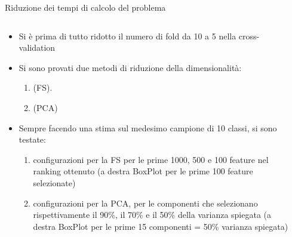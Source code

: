 \documentclass[9pt]{beamer}
\begin{document}
\begin{tframe}{Riduzione dei tempi di calcolo del problema}

\begin{columns}
    \begin{column}{.60\textwidth}
      \minipage[c][0.4\textheight][s]{\columnwidth}
		\begin{itemize}
				\item Si è prima di tutto ridotto il numero di fold da 10 a 5 nella cross-validation
			\onslide<2->
				\item Si sono provati due metodi di riduzione della dimensionalità:
				\begin{enumerate}
					\item {} (FS).
				\onslide<4->
					\item {} (PCA)
				\end{enumerate}
		\item Sempre facendo una stima sul medesimo campione di 10 classi, si sono testate:
		\begin{enumerate}
		\item configurazioni per la FS per le prime 1000, 500 e 100 feature nel ranking ottenuto (a destra BoxPlot per le prime 100 feature selezionate) 
		\onslide<6->
		\item configurazioni per la PCA, per le componenti che selezionano rispettivamente il 90\%, il 70\% e il 50\% della varianza spiegata (a destra BoxPlot per le prime 15 componenti = 50\% varianza spiegata)
		\end{enumerate}
		\end{itemize}	
	 \endminipage
	\end{column}
	
	\begin{column}{.40\textwidth}
      \end{column} 
\end{columns}
\end{tframe}
\end{document}
